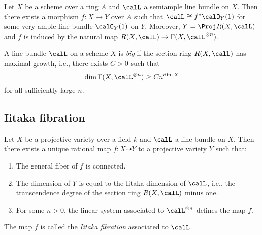     \begin{theorem}\label{thm:fibration_associated_to_semiample_line_bundle}
        Let \(X\) be a scheme over a ring \(A\) and \(\calL\) a semiample line bundle on \(X\).
        Then there exists a morphism \(f:X\to Y\) over \(A\) such that \(\calL\cong f^*\calO_Y(1)\) for some very ample line bundle \(\calO_Y(1)\) on \(Y\).
        Moreover, \(Y=\Proj R(X,\calL)\) and \(f\) is induced by the natural map \(R(X,\calL)\to \Gamma(X,\calL^{\otimes n})\).
        
    \end{theorem}

    \begin{definition}\label{def:big_line_bundle}
        A line bundle \(\calL\) on a scheme \(X\) is \emph{big} if the section ring \(R(X,\calL)\) has maximal growth, i.e., there exists \(C>0\) such that
        \[
            \dim \Gamma(X,\calL^{\otimes n}) \ge C n^{\dim X}
        \]
        for all sufficiently large \(n\).
        
    \end{definition}


\subsection{Iitaka fibration}

    \begin{theorem}\label{thm:iitaka_fibration}
        Let \(X\) be a projective variety over a field \(k\) and \(\calL\) a line bundle on \(X\).
        Then there exists a unique rational map \(f:X\dashrightarrow Y\) to a projective variety \(Y\) such that:
        \begin{enumerate}
            \item The general fiber of \(f\) is connected.
            \item The dimension of \(Y\) is equal to the Iitaka dimension of \(\calL\), i.e., the transcendence degree of the section ring \(R(X,\calL)\) minus one.
            \item For some \(n>0\), the linear system associated to \(\calL^{\otimes n}\) defines the map \(f\).
        \end{enumerate}
        The map \(f\) is called the \emph{Iitaka fibration} associated to \(\calL\).
        
    \end{theorem}